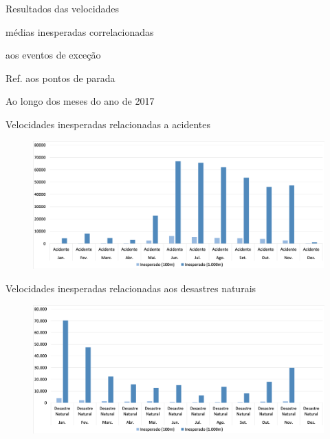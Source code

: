 \documentclass{beamer}
\begin{document}
\begin{frame}
\Huge{\centerline{Resultados das velocidades}}
\Huge{\centerline{médias inesperadas correlacionadas}}
\Huge{\centerline{aos eventos de exceção}}
\Huge{\centerline{Ref. aos \alert{pontos de parada}}}
\Huge{\centerline{Ao longo dos meses do ano de 2017}}
\end{frame}
\begin{frame}{Velocidades inesperadas relacionadas a acidentes}
\begin{figure}[!htb]
	\centering
		\includegraphics[width=1\linewidth]{apriori_analysis_stops_accidents_.png}
	\label{fig:apriori_analysis_stops_accidents}
\end{figure}
\end{frame}
\begin{frame}{Velocidades inesperadas relacionadas aos desastres naturais}
\begin{figure}[!htb]
	\centering
		\includegraphics[width=1\linewidth]{apriori_analysis_stops_natural_disasters_.png}
	\label{fig:apriori_analysis_stops_natural_disasters}
\end{figure}
\end{frame}
\end{document}
